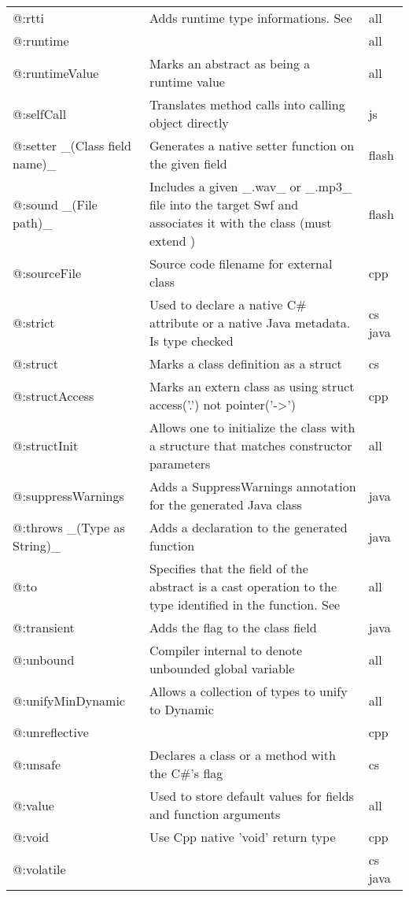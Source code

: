 \begin{center}
\begin{tabular}{| l | l | l |}
	@:rtti   &  Adds runtime type informations. See \tref{RTTI}{cr-rtti}  &  all \\
	@:runtime  &    &  all \\
	@:runtimeValue  &  Marks an abstract as being a runtime value  &  all \\
	@:selfCall  &  Translates method calls into calling object directly  &  js \\
	@:setter \_(Class field name)\_  &  Generates a native setter function on the given field   &  flash \\
	@:sound \_(File path)\_  &  Includes a given \_.wav\_ or \_.mp3\_ file into the target Swf and associates it with the class (must extend \expr{flash.media.Sound})  &  flash \\
	@:sourceFile  &  Source code filename for external class  &  cpp \\
	@:strict  &  Used to declare a native C\# attribute or a native Java metadata. Is type checked  &  cs java \\
	@:struct  &  Marks a class definition as a struct   &  cs \\
	@:structAccess  &  Marks an extern class as using struct access('.') not pointer('->')  &  cpp \\
	@:structInit  &  Allows one to initialize the class with a structure that matches constructor parameters  &  all \\
	@:suppressWarnings  &  Adds a SuppressWarnings annotation for the generated Java class  &  java \\
	@:throws \_(Type as String)\_  &  Adds a \expr{throws} declaration to the generated function   &  java \\
	@:to  &  Specifies that the field of the abstract is a cast operation to the type identified in the function. See \tref{Implicit Casts}{types-abstract-implicit-casts} & all \\
	@:transient  &  Adds the \expr{transient} flag to the class field  &  java \\
	@:unbound  &  Compiler internal to denote unbounded global variable  &  all \\
	@:unifyMinDynamic  &  Allows a collection of types to unify to Dynamic  &  all \\
	@:unreflective  &    &  cpp \\
	@:unsafe  &  Declares a class  or a method with the C\#'s \expr{unsafe} flag   &  cs \\
	@:value  &  Used to store default values for fields and function arguments  &  all \\
	@:void  &  Use Cpp native 'void' return type  &  cpp \\
	@:volatile  &    &  cs  java \\
\end{tabular}
\end{center}

